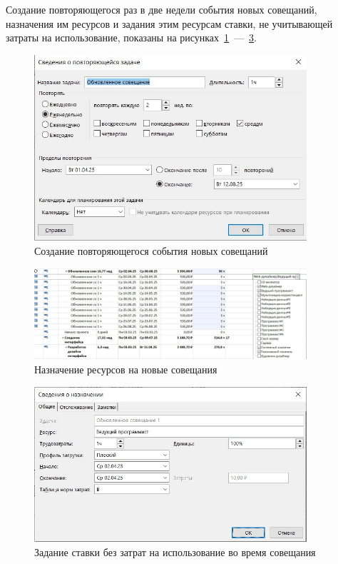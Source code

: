 Создание повторяющегося раз в две недели события новых совещаний, назначения им ресурсов и задания этим ресурсам ставки, не учитывающей затраты на использование, показаны на рисунках~\ref{fig:screen13}~---~\ref{fig:screen15}.

\begin{figure}[H]
	\centering
	\includegraphics[width=0.9\textwidth]{img/screen13.jpg}
	\caption{Создание повторяющегося события новых совещаний}
	\label{fig:screen13}
\end{figure}

\begin{figure}[H]
	\centering
	\includegraphics[width=0.9\textwidth]{img/screen14.jpg}
	\caption{Назначение ресурсов на новые совещания}
	\label{fig:screen14}
\end{figure}

\begin{figure}[H]
	\centering
	\includegraphics[width=0.9\textwidth]{img/screen15.jpg}
	\caption{Задание ставки без затрат на использование во время совещания}
	\label{fig:screen15}
\end{figure}


